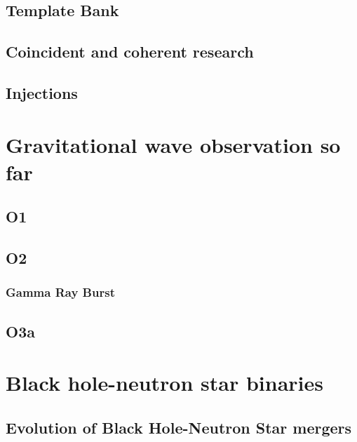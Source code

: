 \documentclass[binding=0.6cm, LaM]{sapthesis}
\begin{document}
\section{Template Bank}

\section{Coincident and coherent research}

\section{Injections}


\chapter{Gravitational wave observation so far}

\section{O1}

\section{O2}

\subsection{Gamma Ray Burst}

\section{O3a}
\chapter{Black hole-neutron star binaries}



\section{Evolution of Black Hole-Neutron Star mergers}
\end{document}
